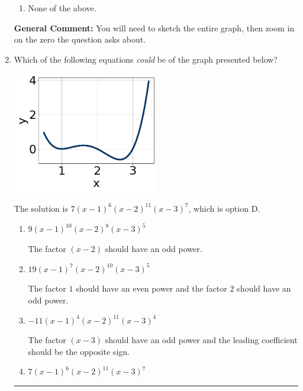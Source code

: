 \documentclass{extbook}[14pt]
\newcommand{\litem}[1]{\item #1

\rule{\textwidth}{0.4pt}}
\begin{document}
\begin{enumerate}
{\begin{enumerate}[label=\Alph*.]
\item None of the above.\end{enumerate}
\textbf{General Comment:} You will need to sketch the entire graph, then zoom in on the zero the question asks about.
}
\litem{
Which of the following equations \textit{could} be of the graph presented below?

\begin{center}
    \includegraphics[width=0.5\textwidth]{../Figures/polyGraphToFunctionC.png}
\end{center}


The solution is \( 7(x - 1)^{6} (x - 2)^{11} (x - 3)^{7} \), which is option D.\begin{enumerate}[label=\Alph*.]
\item \( 9(x - 1)^{10} (x - 2)^{8} (x - 3)^{5} \)

The factor $(x - 2)$ should have an odd power.
\item \( 19(x - 1)^{7} (x - 2)^{10} (x - 3)^{5} \)

The factor $1$ should have an even power and the factor $2$ should have an odd power.
\item \( -11(x - 1)^{4} (x - 2)^{11} (x - 3)^{4} \)

The factor $(x - 3)$ should have an odd power and the leading coefficient should be the opposite sign.
\item \( 7(x - 1)^{6} (x - 2)^{11} (x - 3)^{7} \)


\end{enumerate}}
\end{enumerate}
\end{document}
